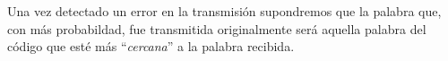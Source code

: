 Una vez detectado un error en la transmisi\'on supondremos que la palabra que, con m\'as probabildad, fue transmitida originalmente ser\'a aquella palabra del c\'odigo que est\'e m\'as ``\emph{cercana}'' a la palabra recibida.

%
%



%
%



%
%


